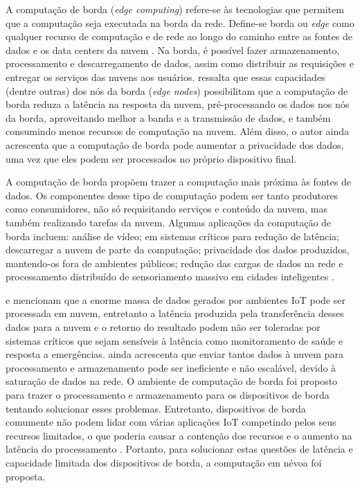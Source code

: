 
A computação de borda (\emph{edge computing}) refere-se às
tecnologias que permitem que a computação seja executada na borda da rede.
Define-se borda ou \emph{edge} como qualquer recurso de computação e de rede ao
longo do caminho entre as fontes de dados e os data centers da nuvem
\cite{Shi2016}.
Na borda, é possível fazer armazenamento, processamento e descarregamento de
dados, assim como distribuir as requisições e entregar os serviços das nuvens
aos usuários.
 ressalta que essas capacidades (dentre outras) dos nós da
borda (\emph{edge nodes}) possibilitam que a computação de borda reduza a
latência na resposta da nuvem, pré-processando os dados nos nós da borda,
aproveitando melhor a banda e a transmissão de dados, e também consumindo menos
recursos de computação na nuvem.
Além disso, o autor ainda acrescenta que a computação de borda pode aumentar a
privacidade dos dados, uma vez que eles podem ser processados no próprio
dispositivo final.

A computação de borda propõem trazer a computação mais próxima às fontes de
dados.
Os componentes desse tipo de computação podem ser
tanto produtores como consumidores, não só requisitando serviços e conteúdo da
nuvem, mas também realizando tarefas da nuvem.
Algumas aplicações da computação de borda incluem: análise de vídeo;
em sistemas críticos para redução de latência;
descarregar a nuvem de parte da computação;
privacidade dos dados produzidos, mantendo-os fora de ambientes públicos;
redução das cargas de dados na rede e
processamento distribuído de sensoriamento massivo em cidades inteligentes \cite{Shi2016}.


 e 
mencionam que a enorme massa de dados gerados por ambientes IoT pode ser
processada em nuvem, entretanto a latência produzida pela transferência desses
dados para a nuvem e o retorno do resultado podem não ser toleradas por sistemas
críticos que sejam sensíveis à latência como monitoramento de saúde e resposta a
emergências.
 ainda acrescenta que enviar tantos
dados à nuvem
para processamento e armazenamento pode ser ineficiente e não escalável, devido à
saturação de dados na rede.
O ambiente de computação de borda foi proposto para trazer o
processamento e armazenamento para os dispositivos de borda tentando solucionar
esses problemas.
Entretanto, dispositivos de borda comumente não podem lidar com várias
aplicações IoT competindo pelos seus recursos limitados, o que poderia causar a
contenção dos recursos e o aumento na latência do processamento
\cite{Dastjerdi2016}. Portanto, para solucionar estas questões de latência e
capacidade limitada dos dispositivos de borda, a computação em névoa foi proposta.

